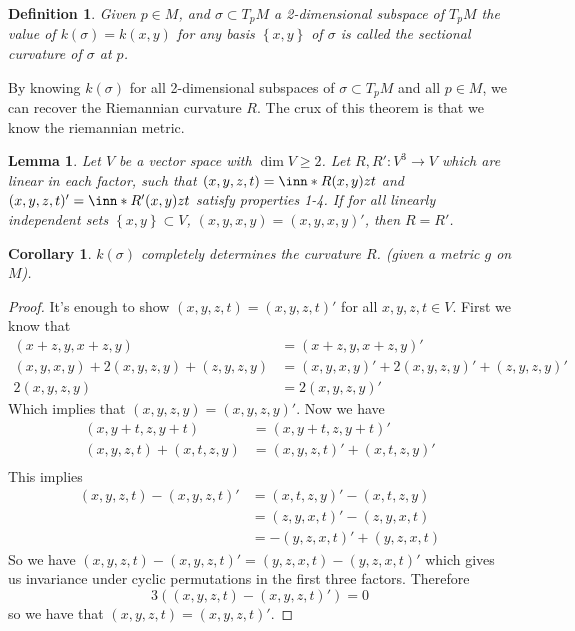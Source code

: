 \documentclass[a4paper]{article}
\newtheorem*{defn}{Definition}
\newtheorem*{cor}{Corollary}
\newtheorem*{lem}{Lemma}
\begin{document}
\begin{defn}
  Given $p \in M$, and $\sigma \subset T_pM$ a 2-dimensional subspace of $T_pM$ the value of $k(\sigma) = k(x,y)$ for any basis $\left\{ x,y \right\}$ of $\sigma$ is called the sectional curvature of $\sigma$ at $p$.
\end{defn}

By knowing $k(\sigma)$ for all 2-dimensional subspaces of $\sigma \subset T_pM$ and all $p \in M$, we can recover the Riemannian curvature $R$. The crux of this theorem is that we know the riemannian metric.

\begin{lem}
  Let $V$ be a vector space with $\dim V \geq 2$. Let $R, R' : V^3 \rightarrow V$ which are linear in each factor, such that $(x,y,z,t) = \inn*{R(x,y)z}{t}$ and $(x,y,z,t)' = \inn*{R'(x,y)z}{t}$ satisfy properties 1-4. If for all linearly independent sets $\left\{ x,y \right\} \subset V$, $(x,y,x,y) = (x,y,x,y)'$, then $R = R'$.
\end{lem}

\begin{cor}
  $k(\sigma)$ completely determines the curvature $R$. (given a metric $g$ on $M$).
\end{cor}

\begin{proof}
  It's enough to show $(x,y,z,t) = (x,y,z,t)'$ for all $x,y,z,t \in V$. First we know that 
  \[
    \begin{aligned}
      (x+z,y, x+z,y) &= (x+z,y,x+z,y)' \\
      (x,y,x,y) + 2(x,y,z,y) + (z,y,z,y) &=(x,y,x,y)' + 2(x,y,z,y)' + (z,y,z,y)' \\
      2(x,y,z,y) &= 2(x,y,z,y)'
    \end{aligned}
  \]
  Which implies that $(x,y,z,y) = (x,y,z,y)'$. Now we have
  \[
    \begin{aligned}
      (x,y+t,z,y+t) &= (x,y+t, z, y+t)' \\
      (x,y,z,t) + (x,t,z,y) &= (x,y,z,t)' + (x,t,z,y)' \\
    \end{aligned}
  \]
  This implies 
  \[
    \begin{aligned}
      (x,y,z,t) - (x,y,z,t)'  &= (x,t,z,y)' - (x,t,z,y) \\
                              &= (z,y,x,t)' - (z,y,x,t) \\
                              &= -(y,z,x,t)' + (y,z,x,t)
    \end{aligned}
  \]
  So we have $(x,y,z,t) - (x,y,z,t)' = (y,z,x,t) - (y,z,x,t)'$ which gives us invariance under cyclic permutations in the first three factors. Therefore 
  \[
    3 \left( (x,y,z,t) - (x,y,z,t)' \right) = 0
  \]
  so we have that $(x,y,z,t) = (x,y,z,t)'$.
\end{proof}
\end{document}
